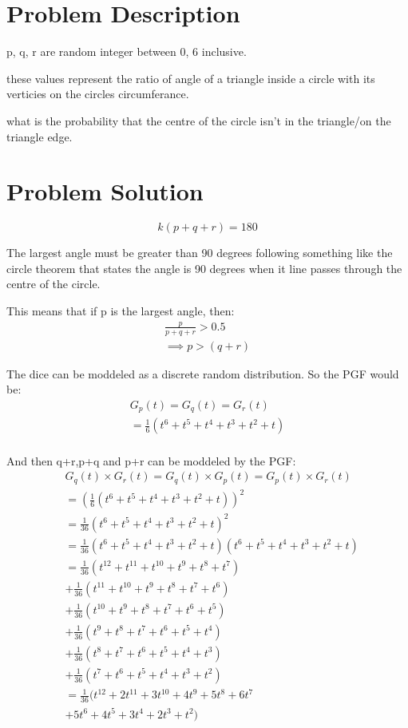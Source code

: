 \documentclass{article}
\begin{document}
\section{Problem Description}
\huge
p, q, r are random integer between 0, 6 inclusive.

these values represent the ratio of angle of a triangle
inside a circle with its verticies on the circles 
circumferance.

what is the probability that the centre of the circle 
isn't in the triangle/on the triangle edge.

\section{Problem Solution}
\[k (p + q + r) = 180\]

The largest angle must be greater than 90 degrees following 
something like the circle theorem that states the angle is
90 degrees when it line passes through the centre of the 
circle.

This means that if p is the largest angle, then:
\begin{align*} 
    \frac{p}{p + q + r} > 0.5 \\
    \implies p > (q+r)
\end{align*} 

The dice can be moddeled as a discrete random distribution.
So the PGF would be:
\begin{align*}
    G_p(t)=G_q(t)=G_r(t)\\
    = \frac{1}{6}(t^6+t^5+t^4+t^3+t^2+t)\\
\end{align*}

And then q+r,p+q and p+r can be moddeled by the PGF:
\begin{align*}
    &G_q(t) \times G_r(t) = G_q(t) \times G_p(t)
        = G_p(t) \times G_r(t)\\
    &= \left( \frac{1}{6}(t^6+t^5+t^4+t^3+t^2+t) \right)^2\\
    &= \frac{1}{36}\left(t^6+t^5+t^4+t^3+t^2+t\right)^2\\
    &= \frac{1}{36}\left(t^{6}+t^5+t^4+t^3+t^2+t\right)
        \left(t^6+t^5+t^4+t^3+t^2+t\right)\\
    &=\frac{1}{36}(t^{12}+t^{11}+t^{10}+t^9+t^8+t^7)\\
    &+\frac{1}{36}(t^{11}+t^{10}+t^9+t^8+t^7+t^6)\\
    &+\frac{1}{36}(t^{10}+t^9+t^8+t^7+t^6+t^5)\\
    &+\frac{1}{36}(t^9+t^8+t^7+t^6+t^5+t^4)\\
    &+\frac{1}{36}(t^8+t^7+t^6+t^5+t^4+t^3)\\
    &+\frac{1}{36}(t^7+t^6+t^5+t^4+t^3+t^2)\\
    &=\frac{1}{36}(t^{12}+2t^{11}+3t^{10}+4t^9+5t^8+6t^7\\
    &+5t^6+4t^5+3t^4+2t^3+t^2)\\
\end{align*}
\end{document}
